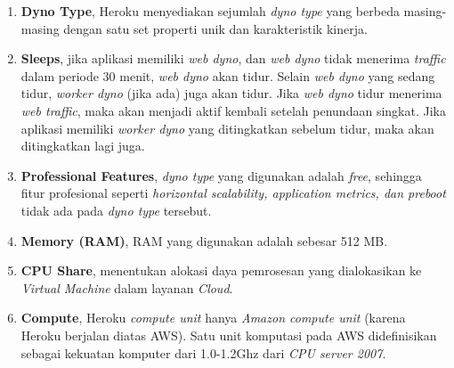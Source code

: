 			\begin{enumerate}
				\item \textbf{Dyno Type}, Heroku menyediakan sejumlah \textit{dyno type} yang berbeda masing-masing dengan satu set properti unik dan karakteristik kinerja.
				\item \textbf{Sleeps}, jika aplikasi memiliki \textit{web dyno}, dan \textit{web dyno} tidak menerima \textit{traffic} dalam periode 30 menit, \textit{web dyno} akan tidur. Selain \textit{web dyno} yang sedang tidur, \textit{worker dyno} (jika ada) juga akan tidur. Jika \textit{web dyno} tidur menerima \textit{web traffic}, maka akan menjadi aktif kembali setelah penundaan singkat. Jika aplikasi memiliki \textit{worker dyno} yang ditingkatkan sebelum tidur, maka akan ditingkatkan lagi juga.  
				\item \textbf{Professional Features}, \textit{dyno type} yang digunakan adalah \textit{free}, sehingga fitur profesional seperti \textit{horizontal scalability, application metrics, dan preboot} tidak ada pada \textit{dyno type} tersebut.
				\item \textbf{Memory (RAM)}, RAM yang digunakan adalah sebesar 512 MB.
				\item \textbf{CPU Share}, menentukan alokasi daya pemrosesan yang dialokasikan ke \textit{Virtual Machine} dalam layanan \textit{Cloud}.
				\item \textbf{Compute}, Heroku \textit{compute unit} hanya \textit{Amazon compute unit} (karena Heroku berjalan diatas AWS). Satu unit komputasi pada AWS didefinisikan sebagai kekuatan komputer dari 1.0-1.2Ghz dari \textit{CPU server 2007}.
			\end{enumerate}
				
